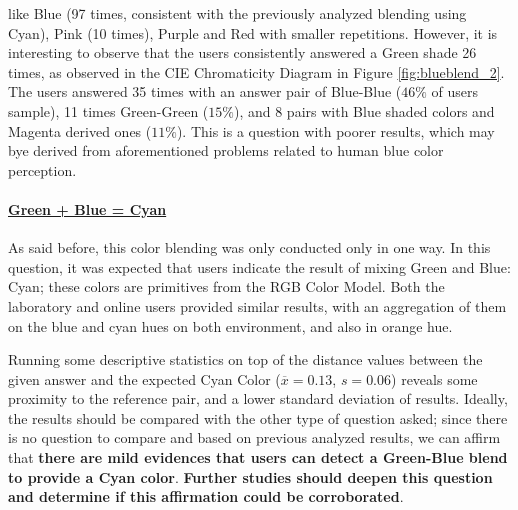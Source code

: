 like Blue (97 times, consistent with the previously analyzed blending using Cyan), Pink (10 times), Purple and Red with smaller repetitions.
However, it is interesting to observe that the users consistently answered a Green shade 26 times, as observed in the CIE Chromaticity Diagram
in Figure \ref{fig:blueblend_2}. The users answered 35 times with an answer pair of Blue-Blue ($46\%$ of users sample), 11 times Green-Green ($15\%$),
and 8 pairs with Blue shaded colors and Magenta derived ones ($11\%$). This is a question with poorer results, which may bye derived from aforementioned
problems related to human blue color perception.
%
\paragraph{\ul{Green + Blue = Cyan}}
%
As said before, this color blending was only conducted only in one way. In this question, it was expected that users indicate the result of mixing Green and Blue: Cyan; these colors are primitives from the RGB Color Model. Both the laboratory
and online users provided similar results, with an aggregation of them on the blue and cyan hues on both environment, and also in orange hue.  \par
%
Running some descriptive statistics on top of the distance values between the given answer and the expected Cyan Color ($\overline{x} = 0.13$, $s = 0.06$) reveals some proximity to the reference pair, and a lower standard deviation of results.
Ideally, the results should be compared with the other type of question asked; since there is no question to compare and based on previous analyzed results, we can affirm that \textbf{there are mild evidences that users can detect a Green-Blue blend
to provide a Cyan color}. \textbf{Further studies should deepen this question and determine if this affirmation could be corroborated}.
%
